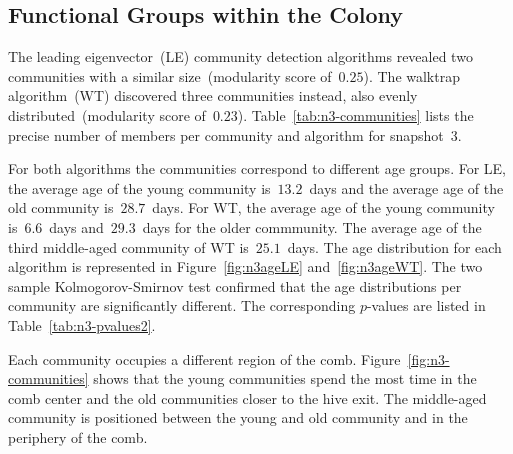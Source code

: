 \subsection{Functional Groups within the Colony}

The leading eigenvector~(LE) community detection algorithms revealed two communities with a similar size~(modularity score of~$0.25$).
The walktrap algorithm~(WT) discovered three communities instead, also evenly distributed~(modularity score of~$0.23$).
Table~\ref{tab:n3-communities} lists the precise number of members per community and algorithm for snapshot~3.

For both algorithms the communities correspond to different age groups.
For LE, the average age of the young community is~$13.2$~days and the average age of  the old community is~$28.7$~days.
For WT, the average age of the young community is~$6.6$~days and~$29.3$~days for the older commmunity.
The average age of the third middle-aged community of WT is~$25.1$~days.
The age distribution for each algorithm is represented in Figure~\ref{fig:n3ageLE} and~\ref{fig:n3ageWT}.
The two sample Kolmogorov-Smirnov test confirmed that the age distributions per community are significantly different.
The corresponding $p$-values are listed in Table~\ref{tab:n3-pvalues2}.

Each community occupies a different region of the comb.
Figure~\ref{fig:n3-communities} shows that the young communities spend the most time in the comb center and the old communities closer to the hive exit. The middle-aged community is positioned between the young and old community and in the periphery of the comb.




